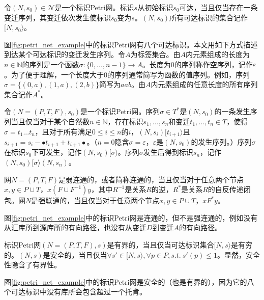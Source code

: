 \begin{definition}[可达标识]\label{def:reachable_markings}
令$(N,s_{0})\in\mathcal{N}$是一个标识Petri网。标识$s$从初始标识$s_{0}$可达，当且仅当存在一条变迁序列，其变迁依次发生使标识$s_{0}$变为$s$。$(N,s_{0})$所有可达标识的集合记作$[N,s_{0}\rangle$。
\end{definition}

图\ref{fig:petri_net_example}中的标识Petri网有八个可达标识。本文用如下方式描述到达某个可达标识的变迁发生序列。令$A$为标签集合。由$A$内元素组成的长度为$n\in\mathbb{N}$的序列是一个函数$\sigma:\{0,...,n-1\}\rightarrow A$。长度为0的序列称作空序列，记作$\varepsilon$。为了便于理解，一个长度大于0的序列通常简写为函数的值序列。例如，序列$\sigma=\{(0,a),(1,a),(2,b)\}$简写为$aab$。由$A$内元素组成的任意长度的所有序列集合记作$A^{*}$。

\begin{definition}[发生序列]\label{def:firing_sequence}
令$(N=(P,T,F),s_{0})$是一个标识Petri网。序列$\sigma\in T^{*}$是$(N,s_{0})$的一条发生序列当且仅当对于某个自然数$n\in\mathbb{N}$，存在标识$s_{1},...,s_{n}$和变迁$t_{1},...,t_{n}\in T$，使得$\sigma=t_{1}...t_{n}$，且对于所有满足$0\leq i\leq n$的$i$，$(N,s_{i})[t_{i+1}\rangle$且$s_{i+1}=s_{i}-\bullet t_{i+1}+t_{i+1}\bullet$。（$n=0$隐含$\sigma=\varepsilon$，$\varepsilon$是$(N,s_{0})$的发生序列。）序列$\sigma$在标识$s_{0}$下可发生，记作$(N,s_{0})[\sigma\rangle$。序列$\sigma$发生后得到标识$s_{n}$，记作$(N,s_{0})[\sigma\rangle(N,s_{n})$。
\end{definition}

\begin{definition}[连通性]\label{def:connectedness}
网$N=(P,T,F)$是弱连通的，或者简称连通的，当且仅当对于任意两个节点$x,y\in P\cup T$，$x(F\cup F^{-1})y$，其中$R^{-1}$是关系$R$的逆，$R^{*}$是关系$R$的自反传递闭包。网$N$是强联通的，当且仅当对于任意两个节点$x,y\in P\cup T$，$xF^{*}y$。
\end{definition}

图\ref{fig:petri_net_example}中的标识Petri网是连通的，但不是强连通的，例如没有从汇库所到源库所的有向路径，也没有从变迁$D$到变迁$A$的有向路径。

\begin{definition}\label{def:boundedness_safeness}
标识Petri网$(N=(P,T,F),s)$是有界的，当且仅当可达标识集合$[N,s\rangle$是有穷的。$(N,s)$是安全的，当且仅当$\forall s'\in[N,s\rangle,\forall p\in P,s.t.~s'(p)\leq 1$。显然，安全性隐含了有界性。
\end{definition}

图\ref{fig:petri_net_example}中的标识Petri网是安全的（也是有界的），因为它的八个可达标识中没有库所会包含超过一个托肯。

